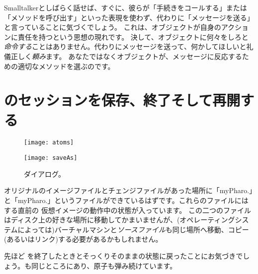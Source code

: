 \documentclass[a4paper,10pt,twoside]{book}
\begin{document}
Smalltalkerとしばらく話せば、すぐに、彼らが「手続きをコールする」または「メソッドを呼び出す」といった表現を使わず、代わりに「メッセージを送る」と言っていることに気づくでしょう。
これは、オブジェクトが自身のアクションに責任を持つという思想の現れです。
決して、オブジェクトに何々をしろと\emph{命令する}ことはありません。代わりにメッセージを送って、何かしてほしいと礼儀正しく\emph{頼み}ます。
あなたではなくオブジェクトが、メッセージに反応するための適切なメソッドを選ぶのです。

\section{\pharo のセッションを保存、終了そして再開する}


\begin{figure}[htb]
\begin{minipage}[b]{0.48\textwidth}
\centerline {\texttt{[image: atoms]}}
\caption{\bam。}
\end{minipage}
\hfill
\begin{minipage}[b]{0.48\textwidth}
\centerline {\texttt{[image: saveAs]}}
\caption{ ダイアログ。}
\end{minipage}
\end{figure}


オリジナルのイメージファイルとチェンジファイルがあった場所に「myPharo.」と「myPharo.」というファイルができているはずです。これらのファイルには  する直前の \pharo 仮想イメージの動作中の状態が入っています。
この二つのファイルはディスク上の好きな場所に移動してかまいませんが、(オペレーティングシステムによっては)バーチャルマシンと\emph{ソースファイル}も同じ場所へ移動、コピー(あるいはリンク)する必要があるかもしれません。


先ほど \pharo を終了したときとそっくりそのままの状態に戻ったことにお気づきでしょう。\bam も同じところにあり、原子も弾み続けています。
\end{document}

